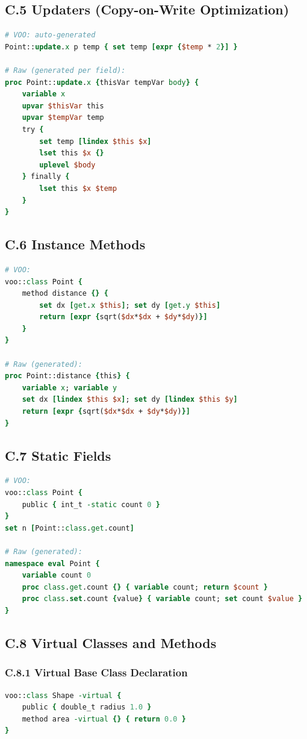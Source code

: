 \subsection*{C.5 Updaters (Copy-on-Write Optimization)}
\begin{lstlisting}[language=Tcl]
# VOO: auto-generated
Point::update.x p temp { set temp [expr {$temp * 2}] }

# Raw (generated per field):
proc Point::update.x {thisVar tempVar body} {
    variable x
    upvar $thisVar this
    upvar $tempVar temp
    try {
        set temp [lindex $this $x]
        lset this $x {}
        uplevel $body
    } finally {
        lset this $x $temp
    }
}
\end{lstlisting}

\subsection*{C.6 Instance Methods}
\begin{lstlisting}[language=Tcl]
# VOO:
voo::class Point {
    method distance {} {
        set dx [get.x $this]; set dy [get.y $this]
        return [expr {sqrt($dx*$dx + $dy*$dy)}]
    }
}

# Raw (generated):
proc Point::distance {this} {
    variable x; variable y
    set dx [lindex $this $x]; set dy [lindex $this $y]
    return [expr {sqrt($dx*$dx + $dy*$dy)}]
}
\end{lstlisting}

\subsection*{C.7 Static Fields}
\begin{lstlisting}[language=Tcl]
# VOO:
voo::class Point {
    public { int_t -static count 0 }
}
set n [Point::class.get.count]

# Raw (generated):
namespace eval Point {
    variable count 0
    proc class.get.count {} { variable count; return $count }
    proc class.set.count {value} { variable count; set count $value }
}
\end{lstlisting}

\subsection*{C.8 Virtual Classes and Methods}

\subsubsection*{C.8.1 Virtual Base Class Declaration}
\begin{lstlisting}[language=Tcl, caption={VOO virtual base}]
voo::class Shape -virtual {
    public { double_t radius 1.0 }
    method area -virtual {} { return 0.0 }
}
\end{lstlisting}

